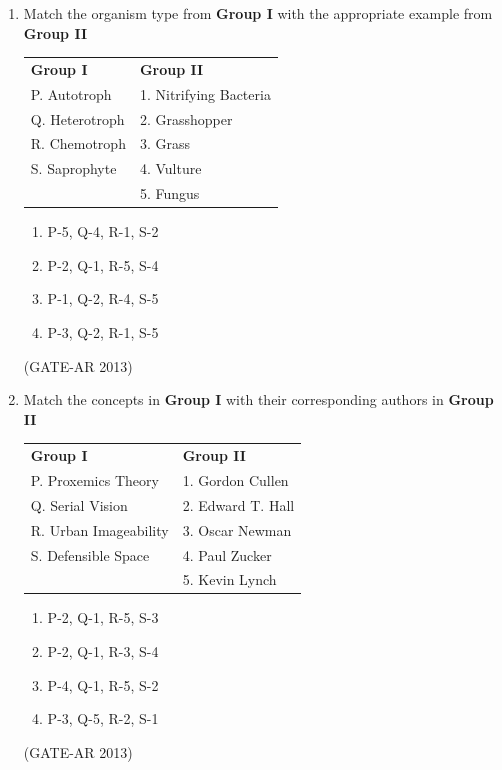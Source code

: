 \documentclass[a4paper,10pt]{article}
\begin{document}
\begin{enumerate}
    \item Match the organism type from \textbf{Group I} with the appropriate example from \textbf{Group II} \\
    \begin{tabular}{ l l }
	\textbf{Group I} & \textbf{Group II} \\
	P. Autotroph & 1. Nitrifying Bacteria \\
	Q. Heterotroph & 2. Grasshopper \\
	R. Chemotroph & 3. Grass \\
	S. Saprophyte & 4. Vulture \\
	& 5. Fungus \\
	\end{tabular}
	\begin{multicols}{2}
	\begin{enumerate}
        \item P-5, Q-4, R-1, S-2
        \item P-2, Q-1, R-5, S-4
        \item P-1, Q-2, R-4, S-5
        \item P-3, Q-2, R-1, S-5
    \end{enumerate}
	\end{multicols}
    \hfill (GATE-AR 2013)

    \item Match the concepts in \textbf{Group I} with their corresponding authors in \textbf{Group II} \\
    \begin{tabular}{ l l }
	\textbf{Group I} & \textbf{Group II} \\
	P. Proxemics Theory & 1. Gordon Cullen \\
	Q. Serial Vision & 2. Edward T. Hall \\
	R. Urban Imageability & 3. Oscar Newman \\
	S. Defensible Space & 4. Paul Zucker \\
	& 5. Kevin Lynch \\
	\end{tabular}
	\begin{multicols}{2}
	\begin{enumerate}
        \item P-2, Q-1, R-5, S-3
        \item P-2, Q-1, R-3, S-4
        \item P-4, Q-1, R-5, S-2
        \item P-3, Q-5, R-2, S-1
    \end{enumerate}
	\end{multicols}
    \hfill (GATE-AR 2013)


\end{enumerate}
\end{document}
